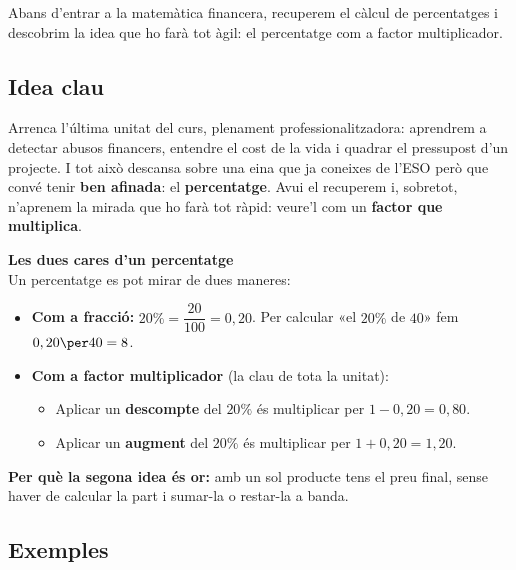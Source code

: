 %
{Abans d'entrar a la matemàtica financera, recuperem el càlcul de percentatges i descobrim la idea que ho farà tot àgil: el percentatge com a factor multiplicador.}

\subsection{Idea clau}

Arrenca l'última unitat del curs, plenament professionalitzadora: aprendrem a detectar
abusos financers, entendre el cost de la vida i quadrar el pressupost d'un projecte. I
tot això descansa sobre una eina que ja coneixes de l'ESO però que convé tenir
\textbf{ben afinada}: el \textbf{percentatge}. Avui el recuperem i, sobretot,
n'aprenem la mirada que ho farà tot ràpid: veure'l com un \textbf{factor que
multiplica}.

\begin{idea}
\textbf{Les dues cares d'un percentatge}\\
Un percentatge es pot mirar de dues maneres:
\begin{itemize}[leftmargin=1.4em, itemsep=3pt]
  \item \textbf{Com a fracció:} $20\% = \dfrac{20}{100}=0,20$. Per calcular «el $20\%$
        de $40$» fem $0,20\per 40=8$.
  \item \textbf{Com a factor multiplicador} (la clau de tota la unitat):
        \begin{itemize}[leftmargin=1.2em, itemsep=1pt]
          \item Aplicar un \textbf{descompte} del $20\%$ és multiplicar per
                $1-0,20=0,80$.
          \item Aplicar un \textbf{augment} del $20\%$ és multiplicar per
                $1+0,20=1,20$.
        \end{itemize}
\end{itemize}
\textbf{Per què la segona idea és or:} amb un sol producte tens el preu final, sense
haver de calcular la part i sumar-la o restar-la a banda.
\end{idea}

\subsection{Exemples}


